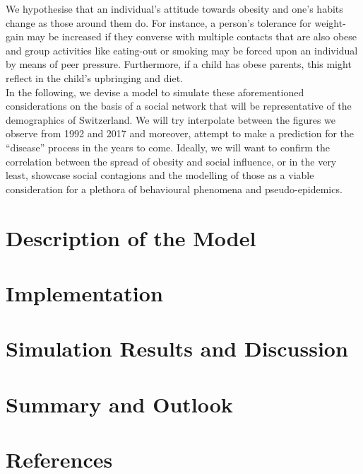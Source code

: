 \documentclass[11pt]{article}
\begin{document}
We hypothesise that an individual’s attitude towards obesity and one’s habits change as those around them do. For instance, a person’s tolerance for weight-gain may be increased if they converse with multiple contacts that are also obese and group activities like eating-out or smoking may be forced upon an individual by means of peer pressure. Furthermore, if a child has obese parents, this might reflect in the child’s upbringing and diet.\\

In the following, we devise a model to simulate these aforementioned considerations on the basis of a social network that will be representative of the demographics of Switzerland. We will try interpolate between the figures we observe from 1992 and 2017 and moreover, attempt to make a prediction for the “disease” process in the years to come. Ideally, we will want to confirm the correlation between the spread of obesity and social influence, or in the very least, showcase social contagions and the modelling of those as a viable consideration for a plethora of behavioural phenomena and pseudo-epidemics.


\section{Description of the Model}

\section{Implementation}

\section{Simulation Results and Discussion}

\section{Summary and Outlook}

\section{References}
\end{document}
